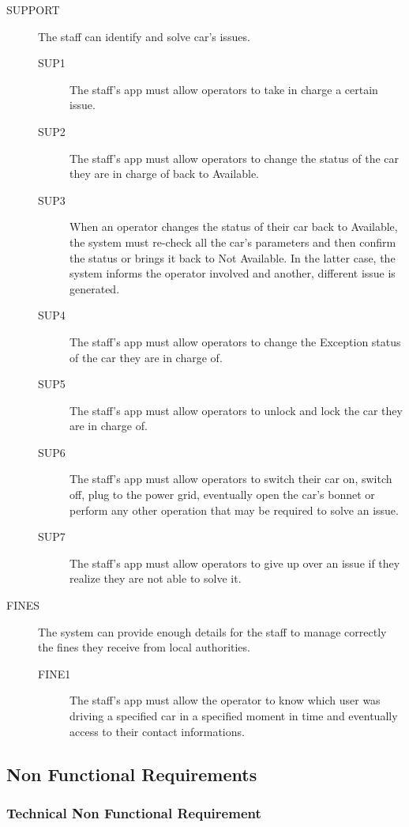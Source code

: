 \documentclass[11pt]{article} %
\begin{document}
\begin{description}
	\item[SUPPORT] The staff can identify and solve car's issues.
	\begin{description}
	\item[SUP1] The staff's app must allow operators to take in charge a certain issue.
	\item[SUP2] The staff's app must allow operators to change the status of the car they are in charge of back to Available.
	\item[SUP3] When an operator changes the status of their car back to Available, the system must re-check all the car's parameters and then confirm the status or brings it back to Not Available. In the latter case, the system informs the operator involved and another, different issue is generated.
	\item[SUP4] The staff's app must allow operators to change the Exception status of the car they are in charge of.	
	\item[SUP5] The staff's app must allow operators to unlock and lock the car they are in charge of.
	\item[SUP6] The staff's app must allow operators to switch their car on, switch off, plug to the power grid, eventually open the car's bonnet or perform any other operation that may be required to solve an issue.
	\item[SUP7] The staff's app must allow operators to give up over an issue if they realize they are not able to solve it.
	\end{description}

	\item[FINES] The system can provide enough details for the staff to manage correctly the fines they receive from local authorities.
	\begin{description}
	\item[FINE1] The staff's app must allow the operator to know which user was driving a specified car in a specified moment in time and eventually access to their contact informations.
	\end{description}
\end{description}

\subsection{Non Functional Requirements}

\subsubsection{Technical Non Functional Requirement}
\end{document}
